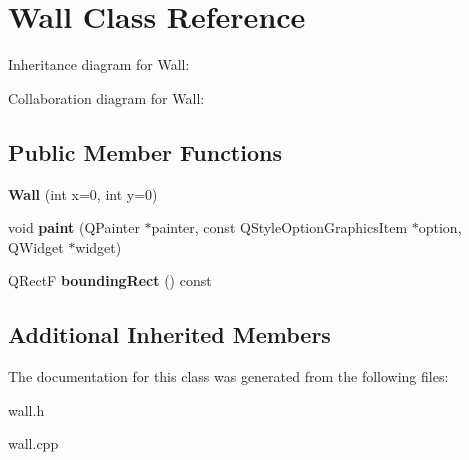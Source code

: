 \hypertarget{class_wall}{\section{Wall Class Reference}
\label{class_wall}
}


Inheritance diagram for Wall\-:


Collaboration diagram for Wall\-:
\subsection*{Public Member Functions}
\begin{DoxyCompactItemize}
\item 
\hypertarget{class_wall_a23004a32bc2720e18793d6db6a5f0fd5}{{\bfseries Wall} (int x=0, int y=0)}\label{class_wall_a23004a32bc2720e18793d6db6a5f0fd5}

\item 
\hypertarget{class_wall_aae57ed47f7d5d58b513d2ebd8feb8057}{void {\bfseries paint} (Q\-Painter $\ast$painter, const Q\-Style\-Option\-Graphics\-Item $\ast$option, Q\-Widget $\ast$widget)}\label{class_wall_aae57ed47f7d5d58b513d2ebd8feb8057}

\item 
\hypertarget{class_wall_aae7888200bcd5afb12b24110886366a0}{Q\-Rect\-F {\bfseries bounding\-Rect} () const }\label{class_wall_aae7888200bcd5afb12b24110886366a0}

\end{DoxyCompactItemize}
\subsection*{Additional Inherited Members}


The documentation for this class was generated from the following files\-:\begin{DoxyCompactItemize}
\item 
wall.\-h\item 
wall.\-cpp\end{DoxyCompactItemize}
